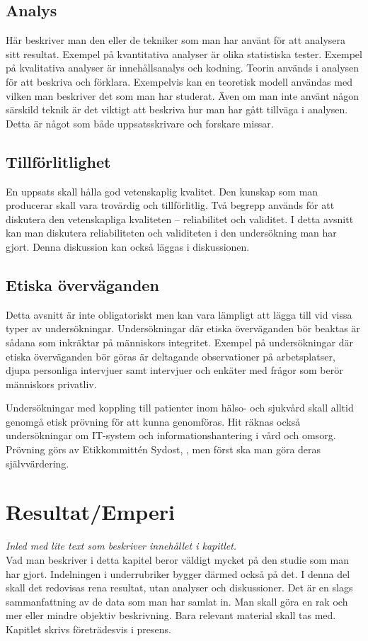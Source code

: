 \documentclass[a4paper,12pt]{article} %
\begin{document}
			
\subsection{Analys}
Här beskriver man den eller de tekniker som man har använt för att analysera sitt resultat. Exempel på kvantitativa analyser är olika statistiska tester. Exempel på kvalitativa analyser är innehållsanalys och kodning. Teorin används i analysen för att beskriva och förklara. Exempelvis kan en teoretisk modell användas med vilken man beskriver det som man har studerat. Även om man inte använt någon särskild teknik är det viktigt att beskriva hur man har gått tillväga i analysen. Detta är något som både uppsatsskrivare och forskare missar. 


\subsection{Tillförlitlighet}
En uppsats skall hålla god vetenskaplig kvalitet. Den kunskap som man producerar skall vara trovärdig och tillförlitlig. Två begrepp används för att diskutera den vetenskapliga kvaliteten – reliabilitet och validitet. I detta avsnitt kan man diskutera reliabiliteten och validiteten i den undersökning man har gjort. Denna diskussion kan också läggas i diskussionen. 


\subsection{Etiska överväganden}
Detta avsnitt är inte obligatoriskt men kan vara lämpligt att lägga till vid vissa typer av undersökningar. Undersökningar där etiska överväganden bör beaktas är sådana som inkräktar på människors integritet. Exempel på undersökningar där etiska överväganden bör göras är deltagande observationer på arbetsplatser, djupa personliga intervjuer samt intervjuer och enkäter med frågor som berör människors privatliv. 

Undersökningar med koppling till patienter inom hälso- och sjukvård skall alltid genomgå etisk prövning för att kunna genomföras. Hit räknas också undersökningar om IT-system och informationshantering i vård och omsorg. Prövning görs av Etikkommittén Sydost, \cite{etik}, men först ska man göra deras självvärdering. 
 


\newpage

\section{Resultat/Emperi}
\emph{Inled med lite text som beskriver innehållet i kapitlet.}\\
Vad man beskriver i detta kapitel beror väldigt mycket på den studie som man har gjort. Indelningen i underrubriker bygger därmed också på det. I denna del skall det redovisas rena resultat, utan analyser och diskussioner. Det är en slags sammanfattning av de data som man har samlat in. Man skall göra en rak och mer eller mindre objektiv beskrivning. Bara relevant material skall tas med. Kapitlet skrivs företrädesvis i presens. 
		
\end{document}
